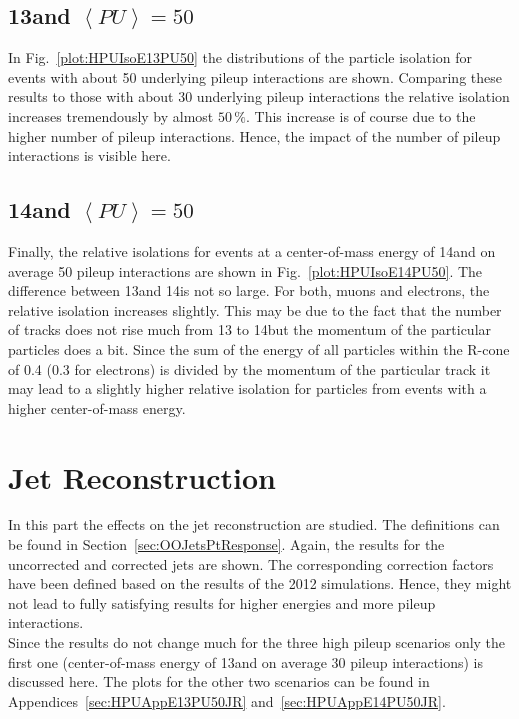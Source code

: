 \subsection{13\TeV and $\left<PU\right>=50$ \label{sec:HPUIsoE13PU50}}

In Fig.~\ref{plot:HPUIsoE13PU50} the distributions of the particle isolation for events with about 50 underlying pileup interactions are shown. Comparing these results to those with about 30 underlying pileup interactions the relative isolation increases tremendously by almost $50\,\%$. This increase is of course due to the higher number of pileup interactions. Hence, the impact of the number of pileup interactions is visible here.

\subsection{14\TeV and $\left<PU\right>=50$ \label{sec:HPUIsoE14PU50}}

Finally, the relative isolations for events at a center-of-mass energy of 14\TeV and on average 50 pileup interactions are shown in Fig.~\ref{plot:HPUIsoE14PU50}. The difference between 13\TeV and 14\TeV is not so large. For both, muons and electrons, the relative isolation increases slightly. This may be due to the fact that the number of tracks does not rise much from 13 to 14\TeV but the momentum of the particular particles does a bit. Since the sum of the energy of all particles within the R-cone of 0.4 (0.3 for electrons) is divided by the momentum of the particular track it may lead to a slightly higher relative isolation for particles from events with a higher center-of-mass energy.

\section{Jet Reconstruction \label{sec:HPUJet}}

In this part the effects on the jet reconstruction are studied. The definitions can be found in Section~\ref{sec:OOJetsPtResponse}. Again, the results for the uncorrected and corrected jets are shown. The corresponding correction factors have been defined based on the results of the 2012 simulations. Hence, they might not lead to fully satisfying results for higher energies and more pileup interactions. \\
Since the results do not change much for the three high pileup scenarios only the first one (center-of-mass energy of 13\TeV and on average 30 pileup interactions) is discussed here. The plots for the other two scenarios can be found in Appendices~\ref{sec:HPUAppE13PU50JR} and~\ref{sec:HPUAppE14PU50JR}.

